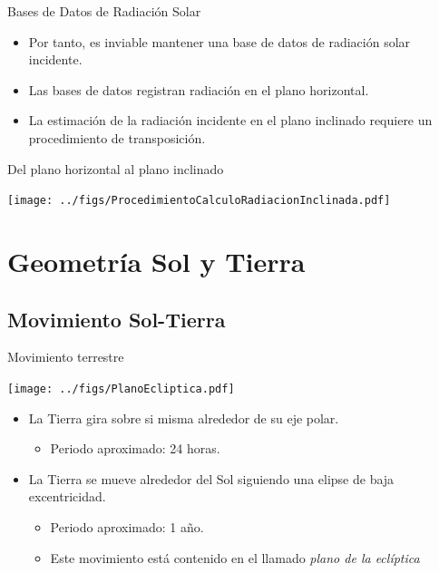 \documentclass[xcolor={usenames,svgnames,dvipsnames}]{beamer}
\begin{document}
\begin{frame}[label={sec:orge00b2f0}]{Bases de Datos de Radiación Solar}
\begin{itemize}
\item Por tanto, es inviable mantener una base de datos de radiación solar \alert{incidente}.
\item Las \alert{bases de datos} registran radiación en el \alert{plano horizontal}.
\item La estimación de la radiación incidente en el plano inclinado requiere un \alert{procedimiento de transposición}.
\end{itemize}
\end{frame}


\begin{frame}[label={sec:org301f9d4}]{Del plano horizontal al plano inclinado}
\begin{center}
\texttt{[image: ../figs/ProcedimientoCalculoRadiacionInclinada.pdf]}
\end{center}
\end{frame}

\section{Geometría Sol y Tierra}
\label{sec:org3218743}
\subsection{Movimiento Sol-Tierra}
\label{sec:org5736f6f}

\begin{frame}[label={sec:org42dd0a4}]{Movimiento terrestre}
\begin{center}
\texttt{[image: ../figs/PlanoEcliptica.pdf]}
\end{center}

\begin{itemize}[<+->]
\item La Tierra \alert{gira sobre si misma} alrededor de su eje polar.
\begin{itemize}[<.->]
\item Periodo aproximado: 24 horas.
\end{itemize}

\item La Tierra se mueve \alert{alrededor del Sol} siguiendo una elipse de baja
excentricidad.
\begin{itemize}[<.->]
\item Periodo aproximado: 1 año.

\item Este movimiento está contenido en el llamado \emph{plano de la
eclíptica}
\end{itemize}
\end{itemize}
\end{frame}
\end{document}
